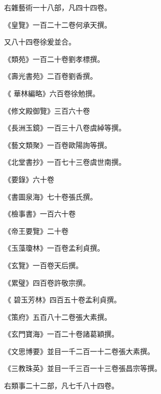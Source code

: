 \begin{pinyinscope}
 右雜藝術一十八部，凡四十四卷。



 《皇覽》一百二十二卷何承天撰。



 又八十四卷徐爰並合。



 《類苑》一百二十卷劉孝標撰。



 《壽光書苑》二百卷劉香撰。



 《
 華林編略》六百卷徐勉撰。



 《修文殿御覽》三百六十卷



 《長洲玉鏡》一百三十八卷虞綽等撰。



 《藝文類聚》一百卷歐陽詢等撰。



 《北堂書抄》一百七十三卷虞世南撰。



 《要錄》六十卷



 《書圖泉海》七十卷張氏撰。



 《檢事書》一百六十卷



 《帝王要覽》二十卷



 《玉藻瓊林》一百卷孟利貞撰。



 《玄覽》一百卷天后撰。



 《累璧》四百卷許敬宗撰。



 《
 碧玉芳林》四百五十卷孟利貞撰。



 《策府》五百八十二卷張大素撰。



 《玄門寶海》一百二十卷諸葛穎撰。



 《文思博要》並目一千二百一十二卷張大素撰。



 《三教珠英》並目一千三百一十三卷張昌宗等撰。



 右類事二十二部，凡七千八十四卷。




\end{pinyinscope}
